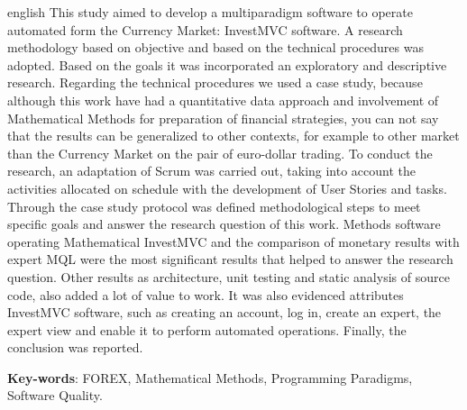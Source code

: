 \begin{resumo}[Abstract]
 \begin{otherlanguage*}{english}
This study aimed to develop a multiparadigm software to operate automated form the Currency Market: InvestMVC software. A research methodology based on objective and based on the technical procedures was adopted. Based on the goals it was incorporated an exploratory and descriptive research. Regarding the technical procedures we used a case study, because although this work have had a quantitative data approach and involvement of Mathematical Methods for preparation of financial strategies, you can not say that the results can be generalized to other contexts, for example to other market than the Currency Market on the pair of euro-dollar trading. To conduct the research, an adaptation of Scrum was carried out, taking into account the activities allocated on schedule with the development of User Stories and tasks. Through the case study protocol was defined methodological steps to meet specific goals and answer the research question of this work. Methods software operating Mathematical InvestMVC and the comparison of monetary results with expert MQL were the most significant results that helped to answer the research question. Other results as architecture, unit testing and static analysis of source code, also added a lot of value to work. It was also evidenced attributes InvestMVC software, such as creating an account, log in, create an expert, the expert view and enable it to perform automated operations. Finally, the conclusion was reported.
   \vspace{\onelineskip}
 
   \noindent
   \textbf{Key-words}: FOREX, Mathematical Methods, Programming Paradigms, Software Quality.
 \end{otherlanguage*}
\end{resumo}
